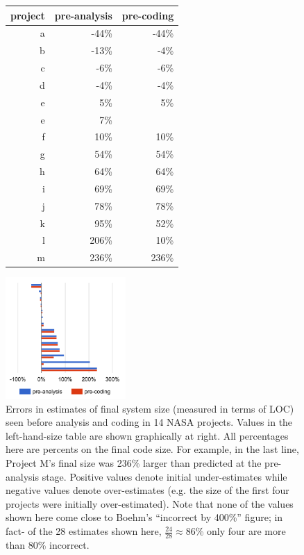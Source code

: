 \documentclass[final,twocolumn,5p]{elsarticle}
\theoremstyle{break}
\begin{document}
    \begin{figure}
      \scriptsize
      \begin{minipage}{.5\linewidth}
      \begin{tabular}{r|rr|}
   project & pre-analysis&pre-coding\\\hline
a&-44\%&-44\%\\
b&-13\%&-4\%\\
c&-6\%&-6\%\\
d&-4\%&-4\%\\
e&5\%&5\%\\
e&7\%&\\
f&10\%&10\%\\
g&54\%&54\%\\
h&64\%&64\%\\
i&69\%&69\%\\
j&78\%&78\%\\
k&95\%&52\%\\
l&206\%&10\%\\
m&236\%&236\%
      \end{tabular}\end{minipage} \begin{minipage}{.33\linewidth}
        \includegraphics[width=1.8in]{nasadata.png}
        \end{minipage}
      \caption{Errors in estimates of final system size (measured in terms of LOC)
        seen before analysis and coding in 14 NASA projects. Values in the left-hand-size table
        are shown graphically at right.
        All percentages here are percents on the final code size. For example, in the last
        line, Project M's final size was 236\% larger than predicted at the pre-analysis stage.
        Positive values denote initial under-estimates while negative values denote over-estimates
        (e.g. the size of the first four projects were initially over-estimated). Note
        that none of the values shown here come close to Boehm's ``incorrect by 400\%'' figure;
        in fact- of the 28 estimates shown here, $\frac{24}{28}\approx 86$\%
        only four are more than 80\% incorrect.}
        \label{fig:loc}
    \end{figure}
\end{document}
